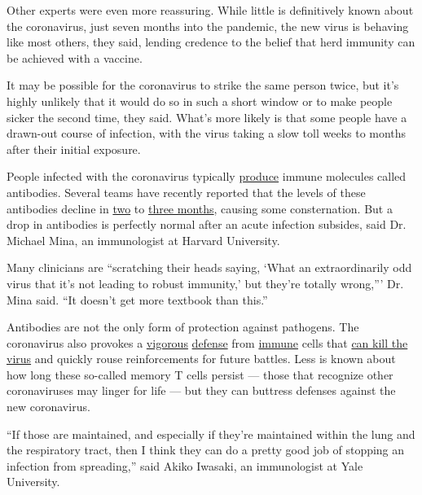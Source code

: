 Other experts were even more reassuring. While little is definitively
known about the coronavirus, just seven months into the pandemic, the
new virus is behaving like most others, they said, lending credence to
the belief that herd immunity can be achieved with a vaccine.

It may be possible for the coronavirus to strike the same person twice,
but it's highly unlikely that it would do so in such a short window or
to make people sicker the second time, they said. What's more likely is
that some people have a drawn-out course of infection, with the virus
taking a slow toll weeks to months after their initial exposure.

People infected with the coronavirus typically
\href{https://www.nature.com/articles/s41586-020-2456-9}{produce} immune
molecules called antibodies. Several teams have recently reported that
the levels of these antibodies decline in
\href{https://www.medrxiv.org/content/10.1101/2020.07.09.20149633v1?\%253fcollection=}{two}
to \href{https://www.nature.com/articles/s41591-020-0965-6}{three
months}, causing some consternation. But a drop in antibodies is
perfectly normal after an acute infection subsides, said Dr. Michael
Mina, an immunologist at Harvard University.

Many clinicians are ``scratching their heads saying, `What an
extraordinarily odd virus that it's not leading to robust immunity,' but
they're totally wrong,''' Dr. Mina said. ``It doesn't get more textbook
than this.''

Antibodies are not the only form of protection against pathogens. The
coronavirus also provokes a
\href{https://www.biorxiv.org/content/10.1101/2020.06.29.174888v1}{vigorous}
\href{https://www.medrxiv.org/content/10.1101/2020.04.11.20062349v2?\%253fcollection=}{defense}
from
\href{https://www.medrxiv.org/content/10.1101/2020.05.13.20100636v1?\%253fcollection=}{immune}
cells that \href{https://pubmed.ncbi.nlm.nih.gov/32473127/}{can kill the
virus} and quickly rouse reinforcements for future battles. Less is
known about how long these so-called memory T cells persist --- those
that recognize other coronaviruses may linger for life --- but they can
buttress defenses against the new coronavirus.

``If those are maintained, and especially if they're maintained within
the lung and the respiratory tract, then I think they can do a pretty
good job of stopping an infection from spreading,'' said Akiko Iwasaki,
an immunologist at Yale University.

